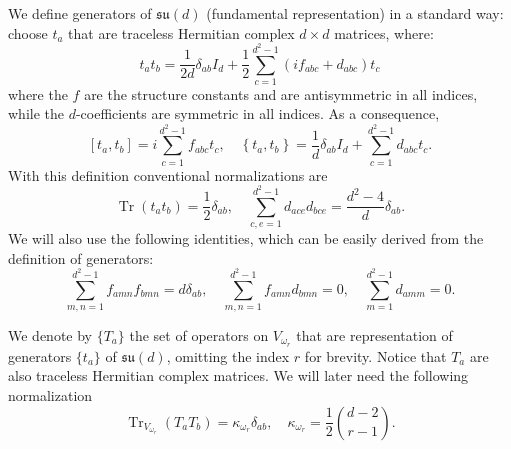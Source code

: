 \documentclass[11pt,letterpaper]{article}
\theoremstyle{plain}
\theoremstyle{plain}
\theoremstyle{plain}
\theoremstyle{plain}
\theoremstyle{plain}
\theoremstyle{plain}
\theoremstyle{plain}
\theoremstyle{definition}
\theoremstyle{plain}
\begin{document}
We define generators of $\mathfrak{su}(d)$ (fundamental representation) in a standard way:
choose $t_a$ that are traceless Hermitian complex $d \times d$ matrices, where:
\begin{equation}\label{eq:sudgenerators}
t_a t_b=\frac{1}{2 d} \delta_{a b} I_d+\frac{1}{2} \sum_{c=1}^{d^2-1}\left(i f_{a b c}+d_{a b c}\right) t_c
\end{equation}
where the $f$ are the structure constants and are antisymmetric in all indices, while the $d$-coefficients are symmetric in all indices.
As a consequence,
$$
\left[t_a, t_b\right]=i \sum_{c=1}^{d^2-1} f_{a b c} t_c, \quad \left\{t_a, t_b\right\}=\frac{1}{d} \delta_{a b} I_d+\sum_{c=1}^{d^2-1} d_{a b c} t_c.
$$
With this definition conventional normalizations are
\begin{equation}\label{eq:sudnormalisation}
\operatorname{Tr}\left(t_a t_b\right)=\frac{1}{2} \delta_{a b}, \quad \sum_{c, e=1}^{d^2-1} d_{a c e} d_{b c e}=\frac{d^2-4}{d} \delta_{a b}.
\end{equation}
We will also use the following identities, which can be easily derived from the definition of generators:
\begin{equation}\label{eq:sudidentities}
    \sum_{m, n=1}^{d^2-1}f_{a m n} f_{b m n}=d \delta_{a b}, \quad \sum_{m, n=1}^{d^2-1}f_{a m n} d_{b m n}=0 , \quad \sum_{m=1}^{d^2-1}d_{a m m}=0 .
\end{equation}

We denote by $\{T_a\}$ the set of operators on $V_{\omega_r}$ that are representation of generators $\{t_a\}$ of $\mathfrak{su}(d)$, omitting the index $r$ for brevity.
Notice that $T_a$ are also traceless Hermitian complex matrices.
We will later need the following normalization 
\begin{equation}\label{eq:sudnormalisation_2}
\operatorname{Tr}_{V_{\omega_r}}\left(T_a T_b\right)=\kappa_{\omega_r} \delta_{a b}, \quad \kappa_{\omega_r}=\frac{1}{2}\binom{d-2}{r-1}.
\end{equation}
\end{document}
